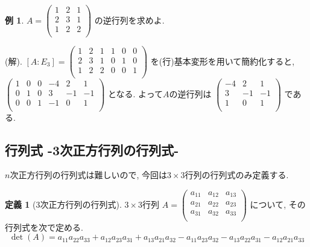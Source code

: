 \documentclass[dvipdfmx,a4paper,11pt]{article}
\theoremstyle{definition}
\newtheorem{dfn}[thm]{定義}
\newtheorem{exa}[thm]{例}
\begin{document}
 \begin{exa}
 $
  A=\begin{pmatrix}
 1& 2&1 \\
 2& 3 & 1 \\
 1& 2 &  2 \\
 \end{pmatrix} 
 $
 の逆行列を求めよ.
 
 (解).
 $[A:E_3] = 
 \begin{pmatrix}
 1& 2&1  &1& 0&0 \\
 2& 3 & 1 &0& 1&0 \\
 1& 2 &  2 &0& 0&1 \\
 \end{pmatrix} 
 $
 を(行)基本変形を用いて簡約化すると, \\
 $
 \begin{pmatrix}
 1& 0&0  &-4& 2&1 \\
 0& 1 & 0 &3& -1&-1 \\
 0& 0&  1 &-1& 0&1 \\
 \end{pmatrix} 
 $
 となる. よって$A$の逆行列は
 $
 \begin{pmatrix}
-4& 2&1 \\
3& -1&-1\\
1& 0&1 \\
 \end{pmatrix} 
 $
 である.
 \end{exa}


 \subsection{行列式 -3次正方行列の行列式-}
 \label{subsec-7-2}
$n$次正方行列の行列式は難しいので, 今回は$3 \times 3$行列の行列式のみ定義する.

 \begin{tcolorbox}[
    colback = white,
    colframe = green!35!black,
    fonttitle = \bfseries,
    breakable = true]
    \begin{dfn}[3次正方行列の行列式]
$3 \times 3$行列
$A = 
  \begin{pmatrix}
a_{11}& a_{12} & a_{13}\\
a_{21}& a_{22} & a_{23}\\
a_{31}& a_{32} & a_{33}\\
 \end{pmatrix} 
$
について, その行列式を次で定める. 
$$
 \det(A)= 
 a_{11}a_{22}a_{33}+ a_{12}a_{23}a_{31}  +  a_{13}a_{21}a_{32} 
- a_{11}a_{23}a_{32}     - a_{13}a_{22}a_{31}  - a_{12}a_{21}a_{33}
$$
  \end{dfn}
 \end{tcolorbox}
\end{document}
